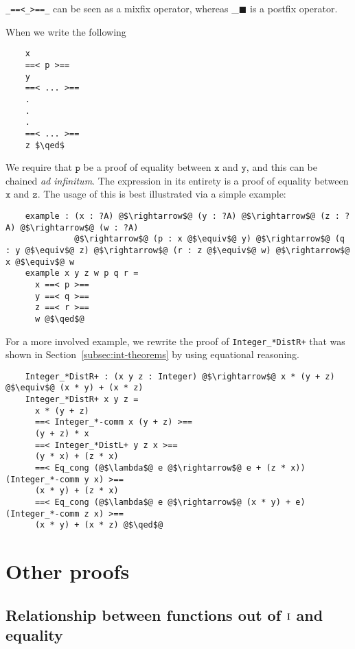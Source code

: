 \documentclass[12pt,twoside,maitrise]{dms}
\theoremstyle{definition}
\numberwithin{equation}{section}
\numberwithin{table}{chapter}
\numberwithin{figure}{chapter}
\newcommand\id[1] {\texttt{#1}}
\newcommand\latinphrase{\textit}
\renewcommand\qed{\blacksquare}
\begin{document}
\verb|_==<_>==_| can be seen as a mixfix operator, whereas \_$\qed$ is a postfix
operator.

When we write the following

\begin{lstlisting}
    x
    ==< p >==
    y
    ==< ... >==
    .
    .
    .
    ==< ... >==
    z $\qed$
\end{lstlisting}

We require that $\id{p}$ be a proof of equality between $\id{x}$ and $\id{y}$,
and this can be chained \latinphrase{ad infinitum}. The expression in its
entirety is a proof of equality between $\id{x}$ and $\id{z}$. The usage of
this is best illustrated via a simple example:

\begin{verbatim}
    example : (x : ?A) @$\rightarrow$@ (y : ?A) @$\rightarrow$@ (z : ?A) @$\rightarrow$@ (w : ?A)
              @$\rightarrow$@ (p : x @$\equiv$@ y) @$\rightarrow$@ (q : y @$\equiv$@ z) @$\rightarrow$@ (r : z @$\equiv$@ w) @$\rightarrow$@ x @$\equiv$@ w
    example x y z w p q r =
      x ==< p >==
      y ==< q >==
      z ==< r >==
      w @$\qed$@
\end{verbatim}

For a more involved example, we rewrite the proof of \verb|Integer_*DistR+|
that was shown in Section~\ref{subsec:int-theorems} by using equational
reasoning.

\begin{verbatim}
    Integer_*DistR+ : (x y z : Integer) @$\rightarrow$@ x * (y + z) @$\equiv$@ (x * y) + (x * z)
    Integer_*DistR+ x y z =
      x * (y + z)
      ==< Integer_*-comm x (y + z) >==
      (y + z) * x
      ==< Integer_*DistL+ y z x >==
      (y * x) + (z * x)
      ==< Eq_cong (@$\lambda$@ e @$\rightarrow$@ e + (z * x)) (Integer_*-comm y x) >==
      (x * y) + (z * x)
      ==< Eq_cong (@$\lambda$@ e @$\rightarrow$@ (x * y) + e) (Integer_*-comm z x) >==
      (x * y) + (x * z) @$\qed$@
\end{verbatim}

\chapter{Other proofs}\label{app:other-proofs}

\section{Relationship between functions out of $\mathrm{I}$ and equality}\label{app:proof-i->a-equiv}
\end{document}

